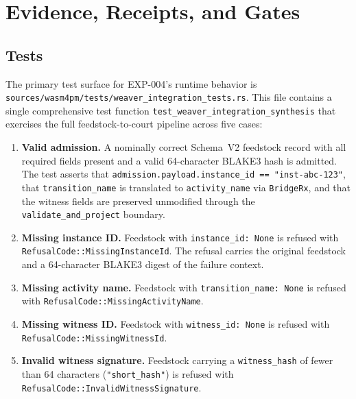 
\section{Evidence, Receipts, and Gates}
\label{sec:otel-weaver-exp-004-registry-to-witness-evidence}

\subsection{Tests}
\label{sec:otel-weaver-exp-004-registry-to-witness-tests}

The primary test surface for EXP-004's runtime behavior is
\texttt{sources/wasm4pm/tests/weaver\_integration\_tests.rs}. This file contains a single
comprehensive test function \texttt{test\_weaver\_integration\_synthesis} that exercises
the full feedstock-to-court pipeline across five cases:

\begin{enumerate}
  \item \textbf{Valid admission.} A nominally correct Schema~V2 feedstock record with all
    required fields present and a valid 64-character BLAKE3 hash is admitted. The test
    asserts that \texttt{admission.payload.instance\_id == "inst-abc-123"}, that
    \texttt{transition\_name} is translated to \texttt{activity\_name} via \texttt{BridgeRx},
    and that the witness fields are preserved unmodified through the \texttt{validate\_and\_project}
    boundary.
  \item \textbf{Missing instance ID.} Feedstock with \texttt{instance\_id: None} is
    refused with \texttt{RefusalCode::MissingInstanceId}. The refusal carries the original
    feedstock and a 64-character BLAKE3 digest of the failure context.
  \item \textbf{Missing activity name.} Feedstock with \texttt{transition\_name: None} is
    refused with \texttt{RefusalCode::MissingActivityName}.
  \item \textbf{Missing witness ID.} Feedstock with \texttt{witness\_id: None} is refused
    with \texttt{RefusalCode::MissingWitnessId}.
  \item \textbf{Invalid witness signature.} Feedstock carrying a \texttt{witness\_hash}
    of fewer than 64 characters (\texttt{"short\_hash"}) is refused with
    \texttt{RefusalCode::InvalidWitnessSignature}.
\end{enumerate}

